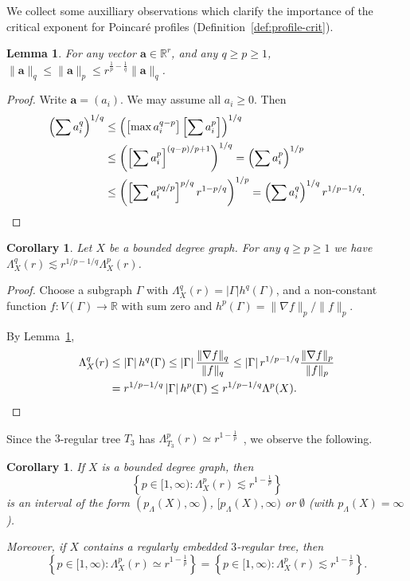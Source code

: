 \documentclass[11pt]{amsart}
\numberwithin{equation}{section}
\newtheorem{corollary}[equation]{Corollary}
\newtheorem{lemma}[equation]{Lemma}
\theoremstyle{citing}
\newcommand{\R}{\mathbb{R}}
\newcommand{\ba}{\mathbf{a}}
\newcommand{\pcrit}{p_{\Lambda}}
\numberwithin{equation}{section}
\begin{document}
We collect some auxilliary observations which clarify the importance of the critical exponent for Poincar\'e profiles (Definition~\ref{def:profile-crit}).
\begin{lemma}\label{lem:lplq-bounds}
    For any vector $\ba \in \R^r$, and any $q \geq p \geq 1$,
	$\| \ba \|_q \leq \| \ba \|_p \leq r^{\frac{1}{p}-\frac{1}{q}} \| \ba \|_q$.
\end{lemma} 
\begin{proof}
  Write $\ba = (a_i)$.  We may assume all $a_i \geq 0$.  Then
  \begin{align*}
	\left(\sum a_i^q \right)^{1/q}
	& \leq \left( \left[\max a_i^{q-p}\right] \left[\sum a_i^p \right]\right)^{1/q} 
	\\ & \leq \left( \left[\sum a_i^p \right]^{(q-p)/p + 1}\right)^{1/q}
	 = \left(\sum a_i^p \right)^{1/p}
	  \\ & \leq \left( \left[\sum a_i^{pq/p}\right]^{p/q} r^{1-p/q}\right)^{1/p}
	 = \left(\sum a_i^q \right)^{1/q} r^{1/p-1/q}. \qedhere
  \end{align*}
\end{proof}
\begin{corollary}\label{cor:lqlpweakbound}
	Let $X$ be a bounded degree graph. For any $q \geq p \geq 1$ we have $\Lambda^q_X(r) \lesssim r^{1/p-1/q} \Lambda^p_X(r)$.
\end{corollary}
\begin{proof}
	Choose a subgraph $\Gamma$ with $\Lambda^q_X(r)=|\Gamma| h^q(\Gamma)$,
	and a non-constant function $f:V(\Gamma)\to\R$ with sum zero and $h^p(\Gamma) = \|\nabla f\|_p/ \|f\|_p$.

  By Lemma~\ref{lem:lplq-bounds},
  \begin{align*}
	\Lambda^q_X(r)
	& \leq |\Gamma |\, h^q(\Gamma)
	  \leq |\Gamma |\, \frac{\|\nabla f\|_q}{\|f\|_q}
	  \leq |\Gamma |\, r^{1/p-1/q} \frac{\|\nabla f\|_p}{\|f\|_p}
	\\ & = r^{1/p-1/q}\, |\Gamma|\, h^p(\Gamma) 
	\leq r^{1/p-1/q} \Lambda^p(X). \qedhere
  \end{align*}
\end{proof}

Since the $3$-regular tree $T_3$ has $\Lambda_{T_3}^p(r) \simeq r^{1-\frac{1}{p}}$~\cite[Theorem 10.1]{HumeMackTess-Pprof}, we observe the following.

\begin{corollary}\label{cor:crit-exponent-interval}
	If $X$ is a bounded degree graph, then
	\[
    \left\{ p \in [1,\infty) : \Lambda_X^p(r) \lesssim r^{1-\frac{1}{p}}  \right\}
	\]
	is an interval of the form $(\pcrit(X),\infty)$, $[\pcrit(X),\infty)$ or $\emptyset$ (with $\pcrit(X)=\infty$).

Moreover, if $X$ contains a regularly embedded $3$-regular tree, then
	\[
		\left\{ p \in [1,\infty) : \Lambda_X^p(r) \simeq r^{1-\frac{1}{p}}  \right\}
        = \left\{ p \in [1,\infty) : \Lambda_X^p(r) \lesssim r^{1-\frac{1}{p}}  \right\}.
	\]
\end{corollary}
\end{document}
